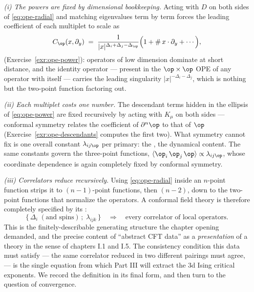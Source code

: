 \emph{(i) The powers are fixed by dimensional bookkeeping.} Acting with $D$ on
both sides of \eqref{eq:ope-radial} and matching eigenvalues term by term
forces the leading coefficient of each multiplet to scale as
\begin{equation}
C_\op(x, \partial_y) \;=\; \frac{1}{|x|^{\Delta_i + \Delta_j - \Delta_\op}}
\Big( 1 + \#\, x\cdot\partial_y + \cdots \Big),
\label{eq:ope-power}
\end{equation}
(Exercise~\ref{exr:ope-power}): operators of low dimension dominate at short
distance, and the identity operator --- present in the $\op\times\op$ OPE of
any operator with itself --- carries the leading singularity
$|x|^{-\Delta_i-\Delta_j}$, which is nothing but the two-point function
factoring out.

\emph{(ii) Each multiplet costs one number.} The descendant terms hidden in
the ellipsis of \eqref{eq:ope-power} are fixed recursively by acting with
$K_\mu$ on both sides --- conformal symmetry relates the coefficient of
$\partial^n \op$ to that of $\op$ (Exercise~\ref{exr:ope-descendants} computes
the first two). What symmetry cannot fix is one overall constant
$\lambda_{ij\op}$ per primary: the , the
dynamical content. The same constants govern the three-point functions,
$\langle \op_i\, \op_j\, \op \rangle \propto \lambda_{ij\op}$, whose
coordinate dependence is again completely fixed by conformal symmetry.

\emph{(iii) Correlators reduce recursively.} Using \eqref{eq:ope-radial}
inside an $n$-point function strips it to $(n-1)$-point functions, then
$(n-2)$, down to the two-point functions that normalize the operators. A
conformal field theory is therefore completely specified by its
:
\begin{equation}
\big\{\, \Delta_i \; (\text{and spins}) \,;\; \lambda_{ijk} \,\big\}
\quad\Longrightarrow\quad \text{every correlator of local operators}.
\label{eq:cft-data}
\end{equation}
This is the finitely-describable generating structure the chapter opening
demanded, and the precise content of ``abstract CFT data'' as a
\emph{presentation} of a theory in the sense of chapters I.1 and I.5. The
consistency condition this data must satisfy --- the same correlator reduced
in two different pairings must agree,  --- is the
single equation from which Part III will extract the 3d Ising critical
exponents. We record the definition in its final form, and then turn to the
question of convergence.

